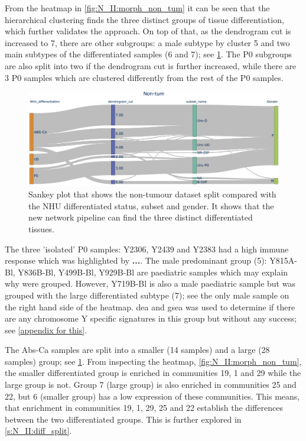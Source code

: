 From the heatmap in \cref{fig:N_II:morph_non_tum} it can be seen that the hierarchical clustering finds the three distinct groups of tissue differentiation, which further validates the approach. On top of that, as the dendrogram cut is increased to 7, there are other subgroups: a male subtype by cluster 5 and two main subtypes of the differentiated samples (6 and 7); see \cref{fig:N_II:sankey_comp}. The P0 subgroups are also split into two if the dendrogram cut is further increased, while there are 3 P0 samples which are clustered differently from the rest of the P0 samples. 

\begin{figure}[!htb]    
    \centering
    \includegraphics[width=1.0\textwidth,height=1.0\textheight,keepaspectratio]{Sections/Network_II/resources/non_tum/non_tum_split.png}
    \caption{Sankey plot that shows the non-tumour dataset split compared with the NHU differentiated status, subset and gender. It shows that the new network pipeline can find the three distinct differentiated tissues.}
    \label{fig:N_II:sankey_comp}
\end{figure}

The three 'isolated' P0 samples: Y2306, Y2439 and Y2383 had a high immune response which was highlighted by \textbf{...}. The male predominant group (5): Y815A-Bl, Y836B-Bl, Y499B-Bl, Y929B-Bl are paediatric samples which may explain why were grouped. However, Y719B-Bl is also a male paediatric sample but was grouped with the large differentiated subtype (7); see the only male sample on the right hand side of the heatmap. \acrfull{dea} and \acrfull{gsea} was used to determine if there are any chromosome Y specific signatures in this group but without any success; see \cref{appendix  for this}.

The Abs-Ca samples are split into a smaller (14 samples) and a large (28 samples) group; see \cref{fig:N_II:sankey_comp}. From inspecting the heatmap, \cref{fig:N_II:morph_non_tum}, the smaller differentiated group is enriched in communities 19, 1 and 29 while the large group is not. Group 7 (large group) is also enriched in communities 25 and 22,  but 6 (smaller group) has a low expression of these communities. This means, that enrichment in communities 19, 1, 29, 25 and 22 establish the differences between the two differentiated groups. This is further explored in \cref{s:N_II:diff_split}.

